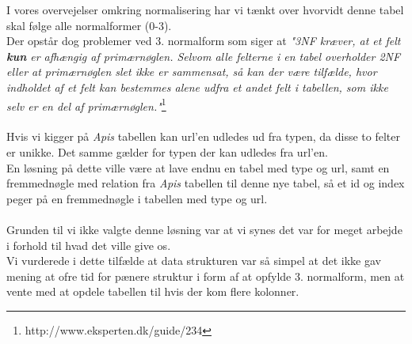 I vores overvejelser omkring normalisering har vi tænkt over hvorvidt denne tabel skal følge alle normalformer (0-3).
\\
Der opstår dog problemer ved 3. normalform som siger at \textit{"3NF kræver, at et felt \textbf{kun} er afhængig af primærnøglen.
Selvom alle felterne i en tabel overholder 2NF eller at primærnøglen slet ikke er sammensat, så kan der være tilfælde, hvor indholdet af et felt kan bestemmes alene udfra et andet felt i tabellen, som ikke selv er en del af primærnøglen."}\footnote{http://www.eksperten.dk/guide/234}
\\\\
Hvis vi kigger på \textit{Apis} tabellen kan url'en udledes ud fra typen, da disse to felter er unikke. Det samme gælder for typen der kan udledes fra url'en.
\\
En løsning på dette ville være at lave endnu en tabel med type og url, samt en fremmednøgle med relation fra \textit{Apis} tabellen til denne nye tabel, så et id og index peger på en fremmednøgle i tabellen med type og url.
\\\\
Grunden til vi ikke valgte denne løsning var at vi synes det var for meget arbejde i forhold til hvad det ville give os.
\\
Vi vurderede i dette tilfælde at data strukturen var så simpel at det ikke gav mening at ofre tid for pænere struktur i form af at opfylde 3. normalform, men at vente med at opdele tabellen til hvis der kom flere kolonner.
